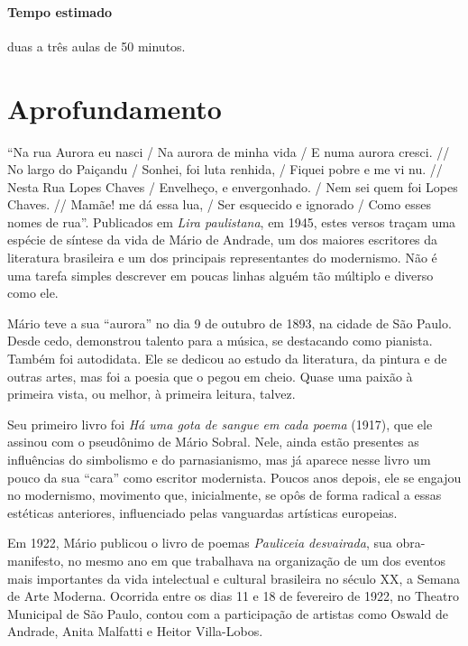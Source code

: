 \documentclass[12pt]{extarticle}
\begin{document}
\paragraph{Tempo estimado} duas a três aulas de 50 minutos.

\section{Aprofundamento}


``Na rua Aurora eu nasci / Na aurora de minha vida / E numa aurora
cresci. // No largo do Paiçandu / Sonhei, foi luta renhida, / Fiquei
pobre e me vi nu. // Nesta Rua Lopes Chaves / Envelheço, e envergonhado.
/ Nem sei quem foi Lopes Chaves. // Mamãe! me dá essa lua, / Ser
esquecido e ignorado / Como esses nomes de rua''. Publicados em
\emph{Lira paulistana}, em 1945, estes versos traçam uma espécie de
síntese da vida de Mário de Andrade, um dos maiores escritores da
literatura brasileira e um dos principais representantes do modernismo.
Não é uma tarefa simples descrever em poucas linhas alguém tão múltiplo e
diverso como ele. 

Mário teve a sua ``aurora'' no dia 9 de outubro de 1893, na cidade de
São Paulo. Desde cedo, demonstrou talento para a música, se destacando
como pianista. Também foi autodidata. Ele se dedicou ao estudo da
literatura, da pintura e de outras artes, mas foi a poesia que o pegou
em cheio. Quase uma paixão à primeira vista, ou melhor, à primeira
leitura, talvez.

Seu primeiro livro foi \emph{Há uma gota de sangue em cada poema}
(1917), que ele assinou com o pseudônimo de Mário Sobral. Nele, ainda
estão presentes as influências do simbolismo e do parnasianismo, mas já
aparece nesse livro um pouco da sua ``cara'' como escritor modernista.
Poucos anos depois, ele se engajou no modernismo, movimento que, inicialmente, 
se opôs de forma radical a essas estéticas anteriores, influenciado
pelas vanguardas artísticas europeias.

Em 1922, Mário publicou o livro de poemas \emph{Pauliceia desvairada},
sua obra-manifesto, no mesmo ano em que trabalhava na organização de um
dos eventos mais importantes da vida intelectual e cultural brasileira
no século XX, a Semana de Arte Moderna. Ocorrida entre os dias 11 e 18
de fevereiro de 1922, no Theatro Municipal de São Paulo, contou
com a participação de artistas como Oswald de Andrade, Anita
Malfatti e Heitor Villa-Lobos.


\end{document}

